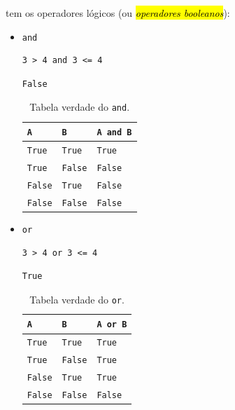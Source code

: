 {\python} tem os operadores lógicos (ou \hl{\emph{operadores booleanos}}):
\begin{itemize}
\item \lstinline+and+ 

\begin{lstlisting}[xrightmargin=2.5em]
3 > 4 and 3 <= 4
\end{lstlisting}

\begin{verbatim}
False
\end{verbatim}

  \begin{table}[H]
    \centering
    \caption{Tabela verdade do \lstinline+and+.}
    \begin{tabular}{ll|l}
      {\texttt{A}} & {\texttt{B}} & {\lstinline+A and B+}\\\hline
      {\texttt{True}} & {\texttt{True}} & {\texttt{True}}\\
      {\texttt{True}} & {\texttt{False}} & {\texttt{False}}\\
      {\texttt{False}} & {\texttt{True}} & {\texttt{False}}\\
      {\texttt{False}} & {\texttt{False}} & {\texttt{False}}\\\hline
    \end{tabular}
  \end{table}

\item \lstinline+or+ 

\begin{lstlisting}[xrightmargin=2.5em]
3 > 4 or 3 <= 4
\end{lstlisting}

\begin{verbatim}
True
\end{verbatim}

  \begin{table}[H]
    \centering
    \caption{Tabela verdade do \lstinline+or+.}
    \begin{tabular}{ll|l}
      {\texttt{A}}     & {\texttt{B}}     & {\lstinline+A or B+} \\\hline
      {\texttt{True}}  & {\texttt{True}}  & {\texttt{True}} \\
      {\texttt{True}}  & {\texttt{False}} & {\texttt{True}} \\
      {\texttt{False}} & {\texttt{True} } & {\texttt{True}} \\
      {\texttt{False}} & {\texttt{False}} & {\texttt{False}} \\\hline
    \end{tabular}
  \end{table}


\end{itemize}
